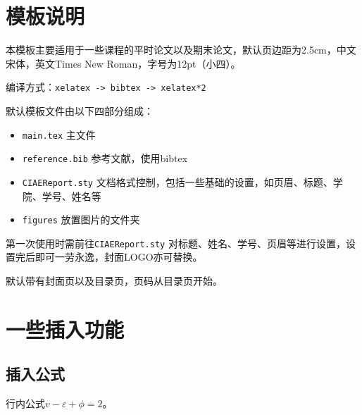 \documentclass[12pt,hyperref,a4paper,UTF8]{ctexart}
\begin{document}
\cover

%
%

\thispagestyle{empty} %

\newpage
\tableofcontents
\thispagestyle{empty} %

\newpage
\setcounter{page}{1} %


\section{模板说明}
本模板主要适用于一些课程的平时论文以及期末论文，默认页边距为2.5cm，中文宋体，英文Times New Roman，字号为12pt（小四）。

编译方式：\verb|xelatex -> bibtex -> xelatex*2|


默认模板文件由以下四部分组成：
\begin{itemize}
    \item \texttt{main.tex} 主文件
    \item \texttt{reference.bib} 参考文献，使用bibtex
    \item \texttt{CIAEReport.sty} 文档格式控制，包括一些基础的设置，如页眉、标题、学院、学号、姓名等
    \item \texttt{figures} 放置图片的文件夹
\end{itemize}

第一次使用时需前往\texttt{CIAEReport.sty} 对标题、姓名、学号、页眉等进行设置，设置完后即可一劳永逸，封面LOGO亦可替换。

默认带有封面页以及目录页，页码从目录页开始。

\section{一些插入功能}
\subsection{插入公式}
行内公式$v-\varepsilon+\phi=2$。
\end{document}
